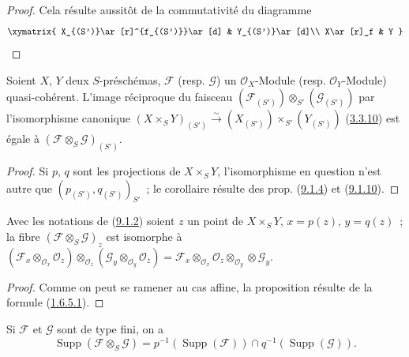 \begin{proof}
Cela résulte aussitôt de la commutativité du diagramme
\[
  \xymatrix{
    X_{(S')}\ar[r]^{f_{(S')}}\ar[d] &
    Y_{(S')}\ar[d]\\
    X\ar[r]_f &
    Y
  }
\]
\end{proof}

\begin{corollary}[9.1.11]
\label{I.9.1.11-fr}
Soient $X$, $Y$ deux $S$-préschémas, $\mathscr{F}$ \textup{(resp. $\mathscr{G}$)} un
$\mathscr{O}_X$-Module \textup{(resp.} $\mathscr{O}_Y$-Module) quasi-cohérent.
L'image réciproque du faisceau
$(\mathscr{F}_{(S')})\otimes_{S'}(\mathscr{G}_{(S')})$ par l'isomorphisme
canonique
$(X\times_S Y)_{(S')}\xrightarrow{\sim}
(X_{(S')})\times_{S'}(Y_{(S')})$
\textup{(\hyperref[I.3.3.10-fr]{3.3.10})} est égale à
$(\mathscr{F}\otimes_S\mathscr{G})_{(S')}$.
\end{corollary}

\begin{proof}
Si $p$, $q$ sont les projections de $X\times_S Y$, l'isomorphisme en
question n'est autre que $(p_{(S')},q_{(S')})_{S'}$~; le corollaire résulte
des prop. (\hyperref[I.9.1.4-fr]{9.1.4}) et
(\hyperref[I.9.1.10-fr]{9.1.10}).
\end{proof}

\begin{proposition}[9.1.12]
\label{I.9.1.12-fr}
Avec les notations de \textup{(\hyperref[I.9.1.2-fr]{9.1.2})} soient $z$ un point de
$X\times_S Y$, $x=p(z)$, $y=q(z)$~; la fibre
$(\mathscr{F}\otimes_S\mathscr{G})_z$ est isomorphe à
$(\mathscr{F}_x\otimes_{\mathscr{O}_x}\mathscr{O}_z)
\otimes_{\mathscr{O}_z}
(\mathscr{G}_y\otimes_{\mathscr{O}_y}\mathscr{O}_z)
=\mathscr{F}_x\otimes_{\mathscr{O}_x}\mathscr{O}_z
\otimes_{\mathscr{O}_y}\otimes\mathscr{G}_y$.
\end{proposition}

\begin{proof}
Comme on peut se ramener au cas affine, la proposition résulte de la formule
(\hyperref[I.1.6.5.1-fr]{1.6.5.1}).
\end{proof}

\begin{corollary}[9.1.13]
\label{I.9.1.13-fr}
Si $\mathscr{F}$ et $\mathscr{G}$ sont de type fini, on a
\[
  \operatorname{Supp}(\mathscr{F}\otimes_S\mathscr{G})
  =p^{-1}(\operatorname{Supp}(\mathscr{F}))
  \cap q^{-1}(\operatorname{Supp}(\mathscr{G})).
\]
\end{corollary}

